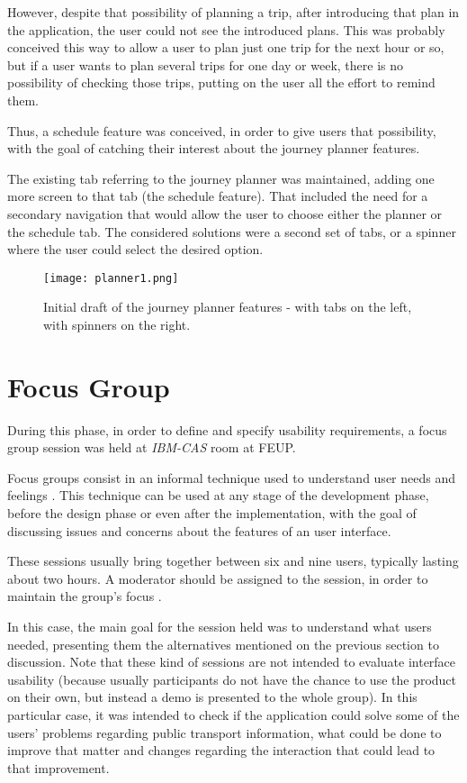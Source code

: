 However, despite that possibility of planning a trip, after introducing that plan in the application, the user could not see the introduced plans. This was probably conceived this way to allow a user to plan just one trip for the next hour or so, but if a user wants to plan several trips for one day or week, there is no possibility of checking those trips, putting on the user all the effort to remind them.

Thus, a schedule feature was conceived, in order to give users that possibility, with the goal of catching their interest about the journey planner features.

The existing tab referring to the journey planner was maintained, adding one more screen to that tab (the schedule feature). That included the need for a secondary navigation that would allow the user to choose either the planner or the schedule tab. The considered solutions were a second set of tabs, or a spinner where the user could select the desired option.

\begin{figure}[h!]
  \begin{center}
    \leavevmode
    \texttt{[image: planner1.png]}
    \caption{Initial draft of the journey planner features - with tabs on the left, with spinners on the right.}
    \label{fig:planner1}
  \end{center}
\end{figure}

\section{Focus Group}\label{focusgroup}

During this phase, in order to define and specify usability requirements, a focus group session was held at \emph{IBM-CAS} room at FEUP.

Focus groups consist in an informal technique used to understand user needs and feelings \cite{kn:KC08}. This technique can be used at any stage of the development phase, before the design phase or even after the implementation, with the goal of discussing issues and concerns about the features of an user interface. 

These sessions usually bring together between six and nine users, typically lasting about two hours. A moderator should be assigned to the session, in order to maintain the group's focus \cite{kn: Nie97}. 

In this case, the main goal for the session held was to understand what users needed, presenting them the alternatives mentioned on the previous section to discussion. Note that these kind of sessions are not intended to evaluate interface usability (because usually participants do not have the chance to use the product on their own, but instead a demo is presented to the whole group). In this particular case, it was intended to check if the application could solve some of the users' problems regarding public transport information, what could be done to improve that matter and changes regarding the interaction that could lead to that improvement.

